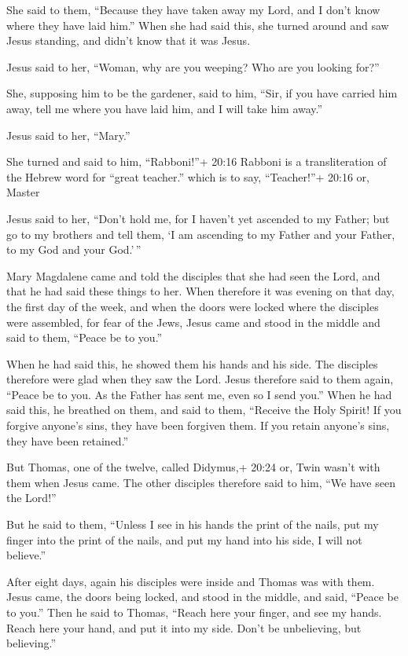 She said to them, ``Because they have taken away my Lord, and I don't
know where they have laid him.''  When she had said this,
she turned around and saw Jesus standing, and didn't know that it was
Jesus.

 Jesus said to her, ``Woman, why are you weeping? Who are
you looking for?''

She, supposing him to be the gardener, said to him, ``Sir, if you have
carried him away, tell me where you have laid him, and I will take him
away.''

 Jesus said to her, ``Mary.''

She turned and said to him, ``Rabboni!''+ 20:16 Rabboni is a
transliteration of the Hebrew word for ``great teacher.'' which is to
say, ``Teacher!''+ 20:16 or, Master

 Jesus said to her, ``Don't hold me, for I haven't yet
ascended to my Father; but go to my brothers and tell them, `I am
ascending to my Father and your Father, to my God and your God.'\,''

 Mary Magdalene came and told the disciples that she had
seen the Lord, and that he had said these things to her. 
When therefore it was evening on that day, the first day of the week,
and when the doors were locked where the disciples were assembled, for
fear of the Jews, Jesus came and stood in the middle and said to them,
``Peace be to you.''

 When he had said this, he showed them his hands and his
side. The disciples therefore were glad when they saw the Lord.
 Jesus therefore said to them again, ``Peace be to you. As
the Father has sent me, even so I send you.''  When he had
said this, he breathed on them, and said to them, ``Receive the Holy
Spirit!  If you forgive anyone's sins, they have been
forgiven them. If you retain anyone's sins, they have been retained.''

 But Thomas, one of the twelve, called Didymus,+ 20:24 or,
Twin wasn't with them when Jesus came.  The other disciples
therefore said to him, ``We have seen the Lord!''

But he said to them, ``Unless I see in his hands the print of the nails,
put my finger into the print of the nails, and put my hand into his
side, I will not believe.''

 After eight days, again his disciples were inside and
Thomas was with them. Jesus came, the doors being locked, and stood in
the middle, and said, ``Peace be to you.''  Then he said to
Thomas, ``Reach here your finger, and see my hands. Reach here your
hand, and put it into my side. Don't be unbelieving, but believing.''

